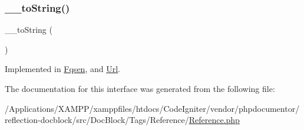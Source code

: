 \subsubsection{\texorpdfstring{\+\_\+\+\_\+to\+String()}{\_\_toString()}}
{\footnotesize\ttfamily \+\_\+\+\_\+to\+String (\begin{DoxyParamCaption}{ }\end{DoxyParamCaption})}



Implemented in \mbox{\hyperlink{classphp_documentor_1_1_reflection_1_1_doc_block_1_1_tags_1_1_reference_1_1_fqsen_a7516ca30af0db3cdbf9a7739b48ce91d}{Fqsen}}, and \mbox{\hyperlink{classphp_documentor_1_1_reflection_1_1_doc_block_1_1_tags_1_1_reference_1_1_url_a7516ca30af0db3cdbf9a7739b48ce91d}{Url}}.



The documentation for this interface was generated from the following file\+:\begin{DoxyCompactItemize}
\item 
/\+Applications/\+X\+A\+M\+P\+P/xamppfiles/htdocs/\+Code\+Igniter/vendor/phpdocumentor/reflection-\/docblock/src/\+Doc\+Block/\+Tags/\+Reference/\mbox{\hyperlink{_reference_8php}{Reference.\+php}}\end{DoxyCompactItemize}
